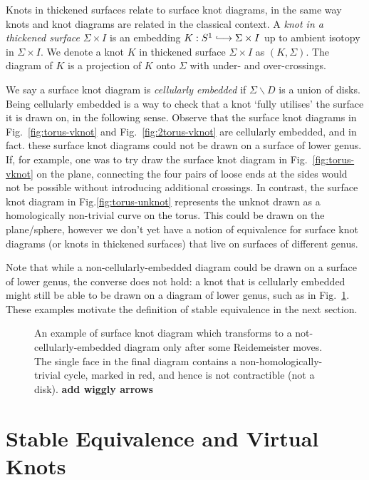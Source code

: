 \documentclass[12pt]{report}
\newcommand{\inject}{\lhook\joinrel\longrightarrow}
\newcommand{\notered}[1]{{\color{Red} \textbf{#1}}}
\theoremstyle{upright}
\begin{document}
Knots in thickened surfaces relate to surface knot diagrams, in the same way knots and knot diagrams are related in the classical context. A \textit{knot in a thickened surface} $\Sigma \times I$ is an embedding $K:S^{1} \inject \Sigma \times I$ up to ambient isotopy in $\Sigma \times I$. We denote a knot $K$ in thickened surface $\Sigma \times I$ as $(K, \Sigma)$. The diagram of $K$ is a projection of $K$ onto $\Sigma$ with under- and over-crossings.

We say a surface knot diagram is \textit{cellularly embedded} if $\Sigma \smallsetminus D$ is a union of disks. Being cellularly embedded is a way to check that a knot `fully utilises' the surface it is drawn on, in the following sense. Observe that the surface knot diagrams in Fig.~\ref{fig:torus-vknot} and Fig.~\ref{fig:2torus-vknot} are cellularly embedded, and in fact. these surface knot diagrams could not be drawn on a surface of lower genus. If, for example, one was to try draw the surface knot diagram in Fig.~\ref{fig:torus-vknot} on the plane, connecting the four pairs of loose ends at the sides would not be possible without introducing additional crossings. In contrast, the surface knot diagram in Fig.\ref{fig:torus-unknot} represents the unknot drawn as a homologically non-trivial curve on the torus. This could be drawn on the plane/sphere, however we don't yet have a notion of equivalence for surface knot diagrams (or knots in thickened surfaces) that live on surfaces of different genus.

Note that while a non-cellularly-embedded diagram could be drawn on a surface of lower genus, the converse does not hold: a knot that is cellularly embedded might still be able to be drawn on a diagram of lower genus, such as in Fig.~\ref{fig:cellular-embedding-tricky}. These examples motivate the definition of stable equivalence in the next section.

\begin{figure}[hbt!]
	\centering
	\def\svgscale{0.56}
	
	
	\caption{An example of surface knot diagram which transforms to a not-cellularly-embedded diagram only after some Reidemeister moves. The single face in the final diagram contains a non-homologically-trivial cycle, marked in red, and hence is not contractible (not a disk). \notered{add wiggly arrows}}
	\label{fig:cellular-embedding-tricky}
\end{figure}

\section{Stable Equivalence and Virtual Knots}
\end{document}
